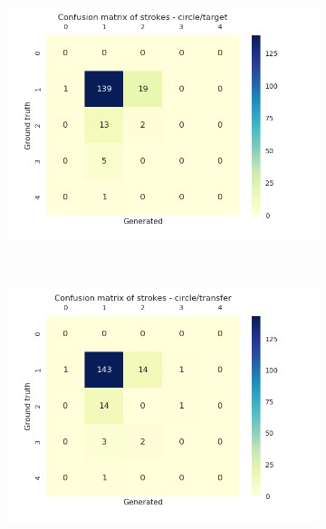     \begin{figure}[!htbp]
      \centering
      \begin{subfigure}[tb]{0.45\textwidth}
          \includegraphics[width=\textwidth]{images/sota/quickdraw_results/quickdraw_circle_target_strokes_heatmap.png}
      \end{subfigure}
      ~
      \begin{subfigure}[tb]{0.45\textwidth}
          \includegraphics[width=\textwidth]{images/sota/quickdraw_results/quickdraw_circle_transfer_strokes_heatmap.png}
      \end{subfigure}


\end{figure}
